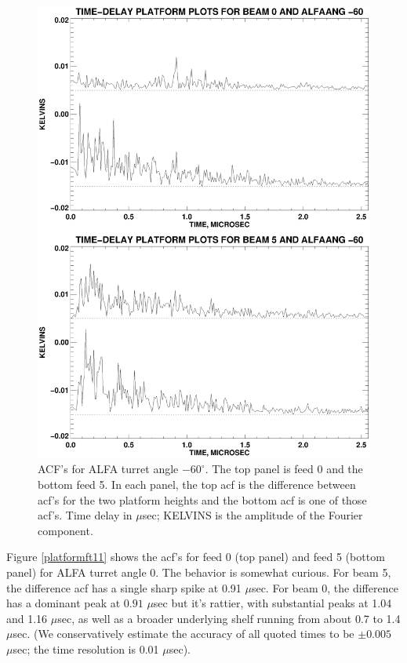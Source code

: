 \documentclass[psfig,preprint]{aastex}
\begin{document}
\begin{figure}[!p]
\begin{center}
\includegraphics[width=6in]{platform_ft9.ps}   
\end{center}
\caption{ACF's for ALFA turret angle $-60^\circ$. 
The top panel is feed 0 and the bottom feed 5. In each panel,
the top acf is the difference between acf's for the two platform heights
and the bottom acf is one of those acf's. Time delay in $\mu$sec;
KELVINS is the amplitude of the Fourier component. \label{platformft9}}
\end{figure}

	Figure \ref{platformft11} shows the acf's for feed 0 (top panel)
and feed 5 (bottom panel) for ALFA turret angle 0.  The behavior is
somewhat curious.  For beam 5, the difference acf has a single sharp
spike at 0.91 $\mu$sec.  For beam 0, the difference has a
dominant peak at $0.91$ $\mu$sec but it's rattier, with
substantial peaks at 1.04 and 1.16 $\mu$sec, as well as a broader
underlying shelf running from about 0.7 to 1.4 $\mu$sec.  (We
conservatively estimate the accuracy of all quoted times to be $\pm
0.005$ $\mu$sec; the time resolution is 0.01 $\mu$sec). 
\end{document}
